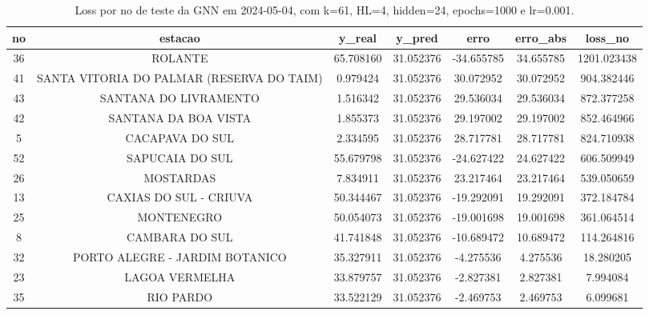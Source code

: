 \begin{table}[h]
\centering
\caption{Loss por no de teste da GNN em 2024-05-04, com k=61, HL=4, hidden=24, epochs=1000 e lr=0.001.}
\label{tab:gnn_loss_k61_hl4_h24_e1000_d20240504}
\begin{tabular}{ccccccc}
\toprule
no & estacao & y\_real & y\_pred & erro & erro\_abs & loss\_no \\
\midrule
36 & ROLANTE & 65.708160 & 31.052376 & -34.655785 & 34.655785 & 1201.023438 \\
41 & SANTA VITORIA DO PALMAR (RESERVA DO TAIM) & 0.979424 & 31.052376 & 30.072952 & 30.072952 & 904.382446 \\
43 & SANTANA DO LIVRAMENTO & 1.516342 & 31.052376 & 29.536034 & 29.536034 & 872.377258 \\
42 & SANTANA DA BOA VISTA & 1.855373 & 31.052376 & 29.197002 & 29.197002 & 852.464966 \\
5 & CACAPAVA DO SUL & 2.334595 & 31.052376 & 28.717781 & 28.717781 & 824.710938 \\
52 & SAPUCAIA DO SUL & 55.679798 & 31.052376 & -24.627422 & 24.627422 & 606.509949 \\
26 & MOSTARDAS & 7.834911 & 31.052376 & 23.217464 & 23.217464 & 539.050659 \\
13 & CAXIAS DO SUL - CRIUVA & 50.344467 & 31.052376 & -19.292091 & 19.292091 & 372.184784 \\
25 & MONTENEGRO & 50.054073 & 31.052376 & -19.001698 & 19.001698 & 361.064514 \\
8 & CAMBARA DO SUL & 41.741848 & 31.052376 & -10.689472 & 10.689472 & 114.264816 \\
32 & PORTO ALEGRE - JARDIM BOTANICO & 35.327911 & 31.052376 & -4.275536 & 4.275536 & 18.280205 \\
23 & LAGOA VERMELHA & 33.879757 & 31.052376 & -2.827381 & 2.827381 & 7.994084 \\
35 & RIO PARDO & 33.522129 & 31.052376 & -2.469753 & 2.469753 & 6.099681 \\
\bottomrule
\end{tabular}
\end{table}
